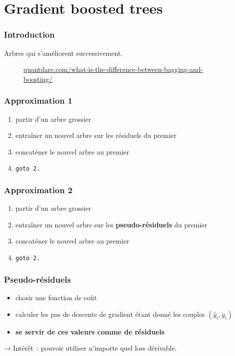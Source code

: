 \section{Gradient boosted trees}

\begin{frame}
  \frametitle{Introduction}

  Arbres qui s'améliorent successivement.
  \begin{figure}
    \centering {}
    \scriptsize{\href{https://quantdare.com/what-is-the-difference-between-bagging-and-boosting/}%
        {quantdare.com/what-is-the-difference-between-bagging-and-boosting/}}
  \end{figure}
\end{frame}

\begin{frame}
  \frametitle{Approximation 1}

  \begin{enumerate}
  \item partir d'un arbre grossier
  \item entraîner un nouvel arbre sur les résiduels du premier
  \item concaténer le nouvel arbre au premier
  \item \texttt{goto 2.}
  \end{enumerate}

\end{frame}

\begin{frame}
  \frametitle{Approximation 2}

  \begin{enumerate}
  \item partir d'un arbre grossier
  \item entraîner un nouvel arbre sur les \textbf{pseudo-résiduels} du
    premier
  \item concaténer le nouvel arbre au premier
  \item \texttt{goto 2.}
  \end{enumerate}

\end{frame}

\begin{frame}
  \frametitle{Pseudo-résiduels}
  \begin{itemize}
  \item chosir une fonction de coût
  \item calculer les pas de descente de gradient étant donné les
    couples $(\hat{y}_i, y_i)$
  \item \textbf{se servir de ces valeurs comme de résiduels}
  \end{itemize}

  → Intérêt : pouvoir utiliser n'importe quel loss dérivable.
\end{frame}

